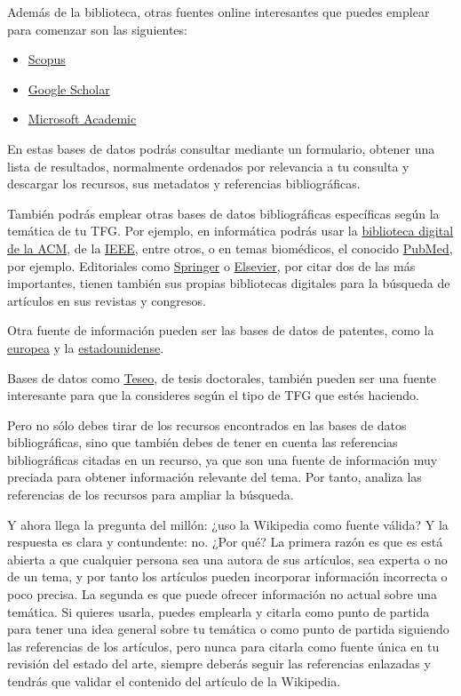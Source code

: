 Además de la biblioteca, otras fuentes online interesantes que puedes emplear para comenzar son las siguientes:

\begin{itemize}
    \item \href{www.scopus.com}{Scopus}
    \item \href{https://scholar.google.es}{Google Scholar}
    \item \href{https://www.microsoft.com/en-us/research/project/academic}{Microsoft Academic}
\end{itemize}

En estas bases de datos podrás consultar mediante un formulario, obtener una lista de resultados, normalmente ordenados por relevancia a tu consulta y descargar los recursos, sus metadatos y referencias bibliográficas.

También podrás emplear otras bases de datos bibliográficas específicas según la temática de tu TFG. Por ejemplo, en informática podrás usar la \href{https://dl.acm.org}{biblioteca digital de la ACM}, de la \href{https://ieeexplore.ieee.org}{IEEE}, entre otros, o en temas biomédicos, el conocido \href{https://pubmed.ncbi.nlm.nih.gov/}{PubMed}, por ejemplo. Editoriales como \href{https://link.springer.com}{Springer} o \href{https://www.sciencedirect.com}{Elsevier}, por citar dos de las más importantes, tienen también sus propias bibliotecas digitales para la búsqueda de artículos en sus revistas y congresos.

Otra fuente de información pueden ser las bases de datos de patentes, como la \href{https://worldwide.espacenet.com}{europea} y la \href{https://ppubs.uspto.gov/pubwebapp/static/pages/landing.html}{estadounidense}.

Bases de datos como \href{https://www.educacion.gob.es/teseo}{Teseo}, de tesis doctorales, también pueden ser una fuente interesante para que la consideres según el tipo de TFG que estés haciendo.

Pero no sólo debes tirar de los recursos encontrados en las bases de datos bibliográficas, sino que también debes de tener en cuenta las referencias bibliográficas citadas en un recurso, ya que son una fuente de información muy preciada para obtener información relevante del tema. Por tanto, analiza las referencias de los recursos para ampliar la búsqueda.

Y ahora llega la pregunta del millón: ¿uso la Wikipedia como fuente válida? Y la respuesta es clara y contundente: no. ¿Por qué? La primera razón es que es está abierta a que cualquier persona sea una autora de sus artículos, sea experta o no de un tema, y por tanto los artículos pueden incorporar información incorrecta o poco precisa. La segunda es que puede ofrecer información no actual sobre una temática. Si quieres usarla, puedes emplearla y citarla como punto de partida para tener una idea general sobre tu temática o como punto de partida siguiendo las referencias de los artículos, pero nunca para citarla como fuente única en tu revisión del estado del arte, siempre deberás seguir las referencias enlazadas y tendrás que validar el contenido del artículo de la Wikipedia. %

